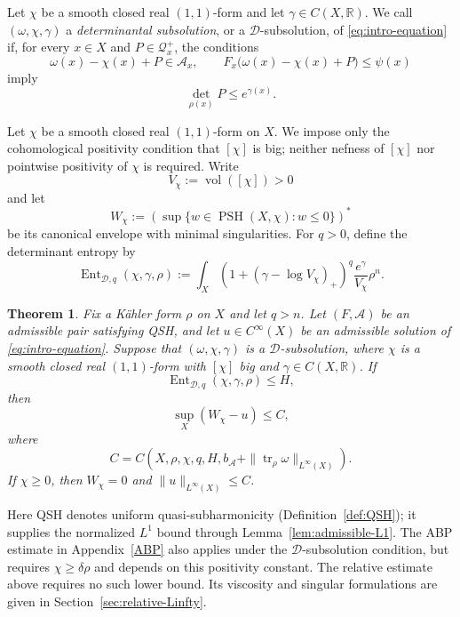 \documentclass[oneside,english,letterpaper]{amsart}
\numberwithin{equation}{section}
\theoremstyle{plain}
\newtheorem{thm}{Theorem}[section]
\theoremstyle{definition}
\theoremstyle{remark}
\begin{document}
Let $\chi$ be a smooth closed real $(1,1)$-form and let
$\gamma\in C(X,\mathbb R)$. We call $(\omega,\chi,\gamma)$ a
\emph{determinantal subsolution}, or a $\mathcal D$-subsolution,
of \eqref{eq:intro-equation} if, for every $x\in X$ and
$P\in\mathcal Q_x^+$, the conditions
\begin{equation}
\label{eq:intro-D-condition}
\omega(x)-\chi(x)+P\in\mathcal A_x,
\qquad
F_x\bigl(\omega(x)-\chi(x)+P\bigr)\leq\psi(x)
\end{equation}
imply
\begin{equation}
\label{eq:intro-D-bound}
\det_{\rho(x)}P\leq e^{\gamma(x)}.
\end{equation}

Let $\chi$ be a smooth closed real $(1,1)$-form on $X$.
We impose only the cohomological positivity condition that
$[\chi]$ is big; neither nefness of $[\chi]$ nor pointwise
positivity of $\chi$ is required. Write
\begin{equation}
\label{eq:intro-volume}
V_\chi:=\operatorname{vol}([\chi])>0
\end{equation}
and let
\begin{equation}
\label{eq:intro-envelope}
W_\chi
:=
\left(
\sup\{w\in\operatorname{PSH}(X,\chi):w\leq0\}
\right)^*
\end{equation}
be its canonical envelope with minimal singularities.
For $q>0$, define the determinant entropy by
\begin{equation}
\label{eq:intro-D-entropy}
\operatorname{Ent}_{\mathcal D,q}(\chi,\gamma,\rho)
:=
\int_X
\left(1+(\gamma-\log V_\chi)_+\right)^q
\frac{e^\gamma}{V_\chi}\rho^n.
\end{equation}

\begin{thm}
\label{thm:intro-relative-Linfty}
Fix a K\"ahler form $\rho$ on $X$ and let $q>n$.
Let $(F,\mathcal A)$ be an admissible pair satisfying QSH,
and let $u\in C^\infty(X)$ be an admissible solution of
\eqref{eq:intro-equation}. Suppose that $(\omega,\chi,\gamma)$
is a $\mathcal D$-subsolution, where $\chi$ is a smooth closed
real $(1,1)$-form with $[\chi]$ big and
$\gamma\in C(X,\mathbb R)$.
If
\[
\operatorname{Ent}_{\mathcal D,q}(\chi,\gamma,\rho)\leq H,
\]
then
\[
\sup_X(W_\chi-u)\leq C,
\]
where
\[
C=C\left(
X,\rho,\chi,q,H,
b_{\mathcal A}
+\|\operatorname{tr}_\rho\omega\|_{L^\infty(X)}
\right).
\]
If $\chi\geq0$, then $W_\chi=0$ and
$\|u\|_{L^\infty(X)}\leq C$.
\end{thm}

Here QSH denotes uniform quasi-subharmonicity
(Definition~\ref{def:QSH}); it supplies the normalized $L^1$
bound through Lemma~\ref{lem:admissible-L1}.
The ABP estimate in Appendix~\ref{ABP} also applies under the
$\mathcal D$-subsolution condition, but requires
$\chi\geq\delta\rho$ and depends on this positivity constant.
The relative estimate above requires no such lower bound.
Its viscosity and singular formulations are given in
Section~\ref{sec:relative-Linfty}.
\end{document}
